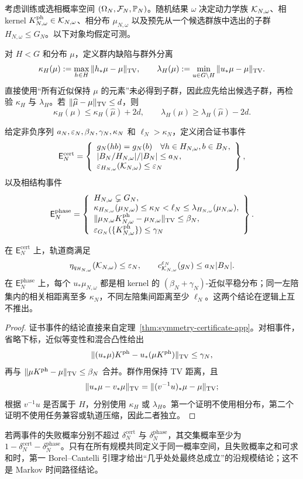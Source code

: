 考虑训练或选相概率空间 $(\Omega_N,\mathcal F_N,\mathbb P_N)$。随机结果 $\omega$ 决定动力学族 $\mathcal K_{N,\omega}$、相 kernel $K^{\mathrm{ph}}_{N,\omega}\in\mathcal K_{N,\omega}$、相分布 $\mu_{N,\omega}$ 以及预先从一个候选群族中选出的子群 $H_{N,\omega}\le G_N$。以下对象均假定可测。

对 $H<G$ 和分布 $\mu$，定义群内缺陷与群外分离
\[
\kappa_H(\mu):=\max_{h\in H}\|h_*\mu-\mu\|_{\operatorname{TV}},
\qquad
\lambda_H(\mu):=\min_{u\in G\setminus H}\|u_*\mu-\mu\|_{\operatorname{TV}}.
\]
直接使用“所有近似保持 $\mu$ 的元素”未必得到子群，因此应先给出候选子群，再检验 $\kappa_H$ 与 $\lambda_H$。若 $\|\widehat\mu-\mu\|_{\operatorname{TV}}\le d$，则
\[
\kappa_H(\mu)\le\kappa_H(\widehat\mu)+2d,
\qquad
\lambda_H(\mu)\ge\lambda_H(\widehat\mu)-2d.
\]

给定非负序列 $a_N,\varepsilon_N,\beta_N,\gamma_N,\kappa_N$ 和 $\ell_N>\kappa_N$，定义闭合证书事件
\[
\mathsf E_N^{\mathrm{cert}}
=\left\{
\begin{array}{l}
g_N(hb)=g_N(b)\quad\forall h\in H_{N,\omega},b\in B_N,\\
|B_N/H_{N,\omega}|/|B_N|\le a_N,\\
\varepsilon_{H_{N,\omega}}(\mathcal K_{N,\omega})\le\varepsilon_N
\end{array}
\right\},
\]
以及相结构事件
\[
\mathsf E_N^{\mathrm{phase}}
=\left\{
\begin{array}{l}
H_{N,\omega}\subsetneq G_N,\\
\kappa_{H_{N,\omega}}(\mu_{N,\omega})\le\kappa_N
<\ell_N\le\lambda_{H_{N,\omega}}(\mu_{N,\omega}),\\
\|\mu_{N,\omega}K^{\mathrm{ph}}_{N,\omega}-\mu_{N,\omega}\|_{\operatorname{TV}}\le\beta_N,\\
\varepsilon_{G_N}(\{K^{\mathrm{ph}}_{N,\omega}\})\le\gamma_N
\end{array}
\right\}.
\]

\begin{theorem}[两类事件的独立后果]
\label{thm:two-events}
在 $\mathsf E_N^{\mathrm{cert}}$ 上，轨道商满足
\[
\eta_{q_{H_{N,\omega}}}(\mathcal K_{N,\omega})\le\varepsilon_N,
\qquad
c_{\mathcal K_{N,\omega}}^{\varepsilon_N}(g_N)\le a_N|B_N|.
\]
在 $\mathsf E_N^{\mathrm{phase}}$ 上，每个 $u_*\mu_{N,\omega}$ 都是相 kernel 的
$(\beta_N+\gamma_N)$-近似平稳分布；同一左陪集内的相关相距离至多 $\kappa_N$，不同左陪集间距离至少 $\ell_N$。这两个结论在逻辑上互不推出。
\end{theorem}

\begin{proof}
证书事件的结论直接来自定理~\ref{thm:symmetry-certificate-app}。对相事件，省略下标，近似等变性和混合凸性给出
\[
\|(u_*\mu)K^{\mathrm{ph}}-u_*(\mu K^{\mathrm{ph}})\|_{\operatorname{TV}}\le\gamma_N,
\]
再与 $\|\mu K^{\mathrm{ph}}-\mu\|_{\operatorname{TV}}\le\beta_N$ 合并。群作用保持 TV 距离，且
\[
\|u_*\mu-v_*\mu\|_{\operatorname{TV}}
=\|(v^{-1}u)_*\mu-\mu\|_{\operatorname{TV}};
\]
根据 $v^{-1}u$ 是否属于 $H$，分别使用 $\kappa_H$ 或 $\lambda_H$。第一个证明不使用相分布，第二个证明不使用任务兼容或轨道压缩，因此二者独立。
\end{proof}

若两事件的失败概率分别不超过 $\delta_N^{\mathrm{cert}}$ 与
$\delta_N^{\mathrm{phase}}$，其交集概率至少为
$1-\delta_N^{\mathrm{cert}}-\delta_N^{\mathrm{phase}}$。只有在所有规模共同定义于同一概率空间，且失败概率之和可求和时，第一 Borel--Cantelli 引理才给出“几乎处处最终总成立”的沿规模结论；这不是 Markov 时间路径结论。
